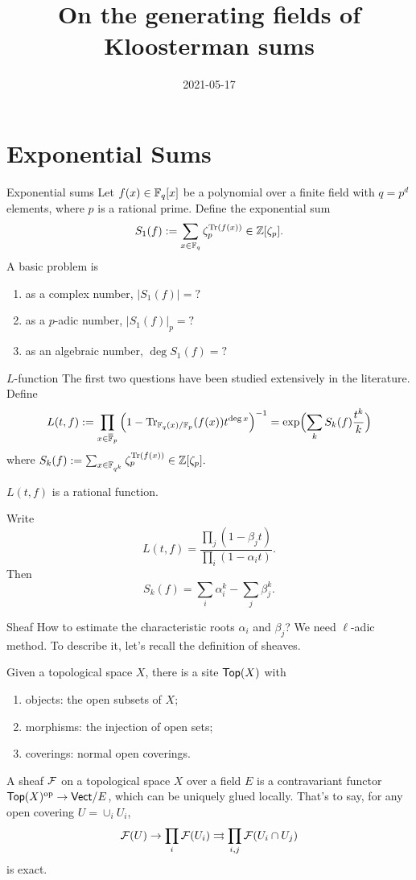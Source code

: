 \documentclass[aspectratio=169,handout]{beamer}
\title{On the generating fields of Kloosterman sums}
\date{2021-05-17}
\begin{document}
\frameoutline

\section{Exponential Sums}

\begin{frame}{Exponential sums}
Let $f(x)\in{\mathbb{F}}_q[x]$ be a polynomial over a finite field with $q=p^d$ elements, where $p$ is a rational prime. \pause
Define the exponential sum
	\[S_1(f):=\sum_{x\in{\mathbb{F}}_q}\zeta_p^{{\mathrm{Tr}}(f(x))}\in{\mathbb{Z}}[\zeta_p].\]
\pause A basic problem is 
\begin{enumerate}
\item as a complex number, $|S_1(f)|=?$
\item as a $p$-adic number, $|S_1(f)|_p=?$
\item as an algebraic number, $\deg S_1(f)=?$
\end{enumerate}
\end{frame}


\begin{frame}{$L$-function}
The first two questions have been studied extensively in the literature.
Define 
	\[L(t,f):=\prod_{x\in \overline{{\mathbb{F}}}_p}\Big(1-{\mathrm{Tr}}_{{\mathbb{F}}_q(x)/{\mathbb{F}}_p}(f(x))t^{\deg x}\Big)^{-1}=\exp\Bigl(\sum_k S_k(f)\frac{t^k}{k}\Bigr)\]
where $S_k(f):=\sum_{x\in{\mathbb{F}}_{q^k}}\zeta_p^{{\mathrm{Tr}}(f(x))}\in{\mathbb{Z}}[\zeta_p].$
 \pause
\begin{theorem}
$L(t,f)$ is a rational function.
\end{theorem} \pause
Write
	\[L(t,f)=\frac{\prod_j (1-\beta_j t)}{\prod_i(1-\alpha_i t)}.\]
Then
	\[S_k(f)=\sum_i \alpha_i^k-\sum_j\beta_j^k.\]
\end{frame}


\begin{frame}{Sheaf}
How to estimate the characteristic roots $\alpha_i$ and $\beta_j$? We need $\ell$-adic method.
To describe it, let's recall the definition of sheaves. \pause

Given a topological space $X$, there is a site ${\mathsf{Top}}(X)$ with 
\begin{enumerate}
\item objects: the open subsets of $X$;
\item morphisms:  the injection of open sets;
\item coverings: normal open coverings.
\end{enumerate} \pause
A sheaf ${\mathcal{F}}$ on a topological space $X$ over a field $E$ is a contravariant functor ${\mathsf{Top}}(X)^{\mathrm{op}}\to{\mathsf{Vect}}/E$, which can be uniquely glued locally. That's to say, for any open covering $U=\cup_i U_i$,
	\[{\mathcal{F}}(U)\to \prod_i{\mathcal{F}}(U_i)\rightrightarrows \prod_{i,j}{\mathcal{F}}(U_i\cap U_j)\]
is exact.
\end{frame}
\end{document}
